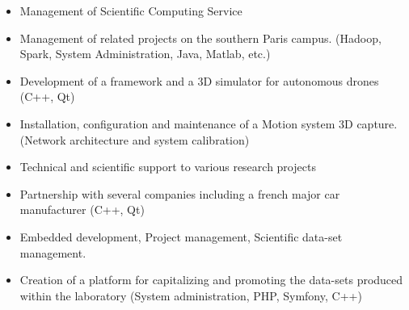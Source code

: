 \divider

\begin{itemize}
    \item Management of Scientific Computing Service
    \item Management of related projects on the southern Paris campus. (Hadoop, Spark, System Administration, Java, Matlab, etc.)
\end{itemize}

\divider

\begin{itemize}
    \item Development of a framework and a 3D simulator for autonomous drones (C++, Qt)
    \item Installation, configuration and maintenance of a Motion system 3D capture. (Network architecture and system calibration)
    \item Technical and scientific support to various research projects
    \item Partnership with several companies including a french major car manufacturer (C++, Qt)
    \item Embedded development, Project management, Scientific data-set management.
    \item Creation of a platform for capitalizing and promoting the data-sets produced within the laboratory (System administration, PHP, Symfony, C++)
\end{itemize}